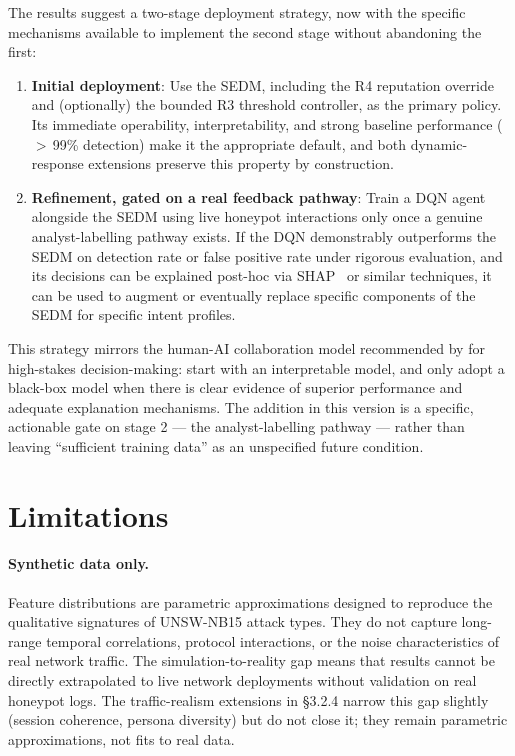 The results suggest a two-stage deployment strategy, now with the specific
mechanisms available to implement the second stage without abandoning the
first:
%
\begin{enumerate}
  \item \textbf{Initial deployment}: Use the SEDM, including the R4
        reputation override and (optionally) the bounded R3 threshold
        controller, as the primary policy.
        Its immediate operability, interpretability, and strong baseline
        performance ($>$\,99\% detection) make it the appropriate default,
        and both dynamic-response extensions preserve this property by
        construction.
  \item \textbf{Refinement, gated on a real feedback pathway}: Train a DQN
        agent alongside the SEDM using live honeypot interactions only once
        a genuine analyst-labelling pathway exists.
        If the DQN demonstrably outperforms the SEDM on detection rate or
        false positive rate under rigorous evaluation, and its decisions
        can be explained post-hoc via SHAP~\citep{lundberg2017unified} or
        similar techniques, it can be used to augment or eventually replace
        specific components of the SEDM for specific intent profiles.
\end{enumerate}

This strategy mirrors the human-AI collaboration model recommended by
\citet{rudin2019stop} for high-stakes decision-making: start with an
interpretable model, and only adopt a black-box model when there is
clear evidence of superior performance and adequate explanation mechanisms.
The addition in this version is a specific, actionable gate on stage 2 ---
the analyst-labelling pathway --- rather than leaving ``sufficient training
data'' as an unspecified future condition.

\section{Limitations}
\label{sec:disc_limitations}

\paragraph{Synthetic data only.}
Feature distributions are parametric approximations designed to reproduce
the qualitative signatures of UNSW-NB15 attack types.
They do not capture long-range temporal correlations, protocol interactions,
or the noise characteristics of real network traffic.
The simulation-to-reality gap means that results cannot be directly
extrapolated to live network deployments without validation on real
honeypot logs.
The traffic-realism extensions in \S3.2.4 narrow this gap slightly (session
coherence, persona diversity) but do not close it; they remain parametric
approximations, not fits to real data.

